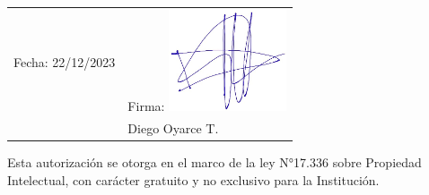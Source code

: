 \begin{enumerate}
    \vspace{1cm}

    \begin{tabular}{@{}l l}
        Fecha: 22/12/2023 \hspace{3cm} & Firma: \includegraphics[height=3cm]{img/firma-diego1.jpeg} \\
        & Diego Oyarce T.
    \end{tabular}
\end{enumerate}

Esta autorización se otorga en el marco de la ley N°17.336 sobre Propiedad Intelectual, con carácter gratuito y no exclusivo para la Institución.